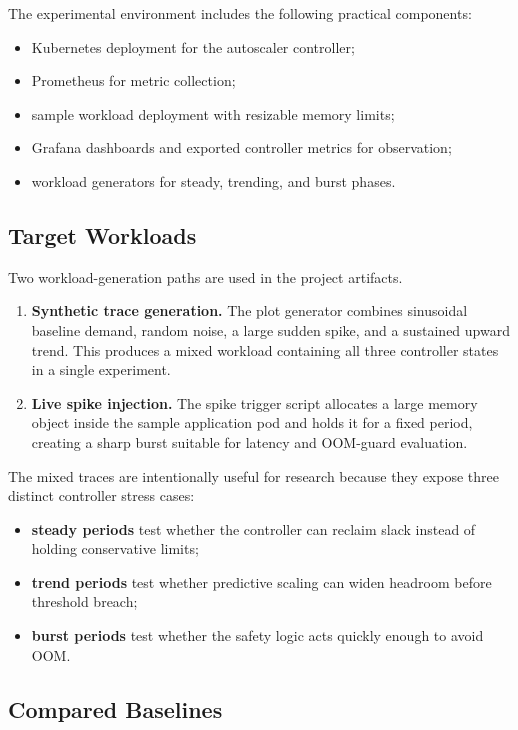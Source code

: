 \documentclass[12pt,a4paper]{article}
\begin{document}
The experimental environment includes the following practical components:
\begin{itemize}
    \item Kubernetes deployment for the autoscaler controller;
    \item Prometheus for metric collection;
    \item sample workload deployment with resizable memory limits;
    \item Grafana dashboards and exported controller metrics for observation;
    \item workload generators for steady, trending, and burst phases.
\end{itemize}

\subsection{Target Workloads}

Two workload-generation paths are used in the project artifacts.
\begin{enumerate}[label=\arabic*)]
    \item \textbf{Synthetic trace generation.} The plot generator combines sinusoidal baseline demand, random noise, a large sudden spike, and a sustained upward trend. This produces a mixed workload containing all three controller states in a single experiment.
    \item \textbf{Live spike injection.} The spike trigger script allocates a large memory object inside the sample application pod and holds it for a fixed period, creating a sharp burst suitable for latency and OOM-guard evaluation.
\end{enumerate}

The mixed traces are intentionally useful for research because they expose three distinct controller stress cases:
\begin{itemize}
    \item \textbf{steady periods} test whether the controller can reclaim slack instead of holding conservative limits;
    \item \textbf{trend periods} test whether predictive scaling can widen headroom before threshold breach;
    \item \textbf{burst periods} test whether the safety logic acts quickly enough to avoid OOM.
\end{itemize}

\subsection{Compared Baselines}
\end{document}
